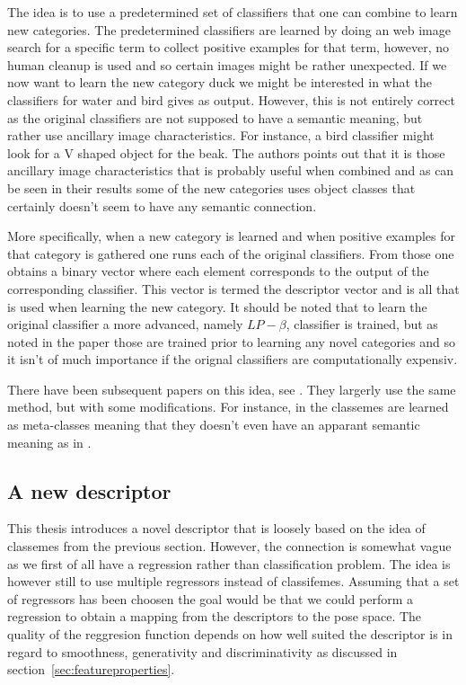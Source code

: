 \documentclass[a4paper,11pt]{kth-mag}
\begin{document}
The idea is to use a predetermined set of classifiers that one can combine to learn new categories.
The predetermined classifiers are learned by doing an web image search for a specific term to collect positive examples for that term, however, no human cleanup is used and so certain images might be rather unexpected.
If we now want to learn the new category duck we might be interested in what the classifiers for water and bird gives as output.
However, this is not entirely correct as the original classifiers are not supposed to have a semantic meaning, but rather use ancillary image characteristics.
For instance, a bird classifier might look for a V shaped object for the beak.
The authors points out that it is those ancillary image characteristics that is probably useful when combined and as can be seen in their results some of the new categories uses object classes that certainly doesn't seem to have any semantic connection\cite{classeme1}.

More specifically, when a new category is learned and when positive examples for that category is gathered one runs each of the original classifiers.
From those one obtains a binary vector where each element corresponds to the output of the corresponding classifier.
This vector is termed the descriptor vector and is all that is used when learning the new category.
It should be noted that to learn the original classifier a more advanced, namely $LP-\beta$, classifier is trained, but as noted in the paper those are trained prior to learning any novel categories and so it isn't of much importance if the orignal classifiers are computationally expensiv.

There have been subsequent papers on this idea, see \cite{classeme2,classeme3}.
They largerly use the same method, but with some modifications.
For instance, in \cite{classeme3} the classemes are learned as meta-classes meaning that they doesn't even have an apparant semantic meaning as in \cite{classeme1,classeme2}.

\subsection{A new descriptor}
This thesis introduces a novel descriptor that is loosely based on the idea of classemes from the previous section. 
However, the connection is somewhat vague as we first of all have a regression rather than classification problem.
The idea is however still to use multiple regressors instead of classifemes.
Assuming that a set of regressors has been choosen the goal would be that we could perform a regression to obtain a mapping from the descriptors to the pose space.
The quality of the reggresion function depends on how well suited the descriptor is in regard to smoothness, generativity and discriminativity as discussed in section~\ref{sec:featureproperties}.
\end{document}
